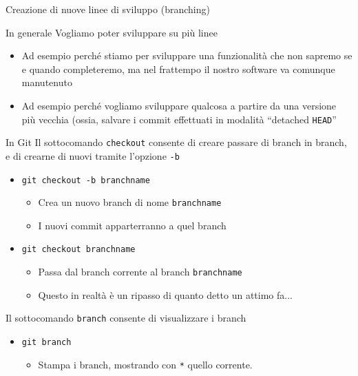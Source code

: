 \documentclass[xcolor=dvipsnames,presentation]{beamer}
\begin{document}
\begin{frame}{Creazione di nuove linee di sviluppo (branching)}
    \begin{block}{In generale}
        Vogliamo poter sviluppare su più linee
        \begin{itemize}
            \item Ad esempio perché stiamo per sviluppare una funzionalità che non sapremo se e quando completeremo, ma nel frattempo il nostro software va comunque manutenuto
            \item Ad esempio perché vogliamo sviluppare qualcosa a partire da una versione più vecchia (ossia, salvare i commit effettuati in modalità ``detached \texttt{HEAD}''
        \end{itemize}
    \end{block}
    \begin{block}{In Git}
        Il sottocomando \texttt{checkout} consente di creare passare di branch in branch, e di crearne di nuovi tramite l'opzione \texttt{-b}
        \begin{itemize}
            \item \texttt{git checkout -b branchname}
            \begin{itemize}
                \item Crea un nuovo branch di nome \texttt{branchname}
                \item I nuovi commit apparterranno a quel branch
            \end{itemize}
            \item \texttt{git checkout branchname}
            \begin{itemize}
                \item Passa dal branch corrente al branch \texttt{branchname}
                \item Questo in realtà è un ripasso di quanto detto un attimo fa...
            \end{itemize}
        \end{itemize}
        Il sottocomando \texttt{branch} consente di visualizzare i branch
        \begin{itemize}
            \item \texttt{git branch}
            \begin{itemize}
                \item Stampa i branch, mostrando con \texttt{*} quello corrente.
            \end{itemize}
        \end{itemize}

\end{block}
\end{frame}
\end{document}
